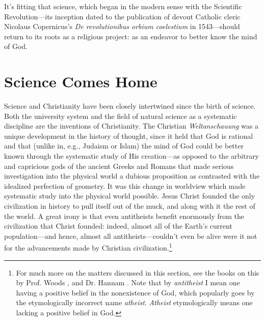 \documentclass[letterpaper,12pt]{article}
\begin{document}
It's fitting that science, which began in the modern sense with the Scientific Revolution---its inception dated to the publication of devout Catholic cleric Nicolaus Copernicus's \emph{De revolutionibus orbium coelestium} in 1543---should return to its roots as a religious project: as an endeavor to better know the mind of God.

\section{Science Comes Home}
\label{sec:ScienceComesHome}

Science and Christianity have been closely intertwined since the birth of science. Both the university system and the field of natural science as a systematic discipline are the inventions of Christianity. The Christian \emph{Weltanschauung} was a unique development in the history of thought, since it held that God is rational and that (unlike in, e.g., Judaism or Islam) the mind of God could be better known through the systematic study of His creation---as opposed to the arbitrary and capricious gods of the ancient Greeks and Romans that made serious investigation into the physical world a dubious proposition as contrasted with the idealized perfection of geometry. It was this change in worldview which made systematic study into the physical world possible. Jesus Christ founded the only civilization in history to pull itself out of the muck, and along with it the rest of the world. A great irony is that even antitheists benefit enormously from the civilization that Christ founded: indeed, almost all of the Earth's current population---and hence, almost all antitheists---couldn't even be alive were it not for the advancements made by Christian civilization.\footnote{For much more on the matters discussed in this section, see the books on this by Prof. Woods \cite{Woods2005}, and Dr. Hannam \cite{Hannam2011}. Note that by \emph{antitheist} I mean one having a positive belief in the nonexistence of God, which popularly goes by the etymologically incorrect name \emph{atheist}. \emph{Atheist} etymologically means one lacking a positive belief in God.}
\end{document}
